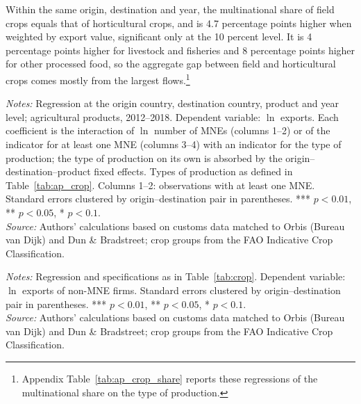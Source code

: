 Within the same origin, destination and year, the multinational share of field crops equals that of
horticultural crops, and is 4.7 percentage points higher when weighted by export value, significant only at the 10
percent level. It is 4 percentage points higher for livestock and fisheries and 8 percentage points higher
for other processed food, so the aggregate gap between field and horticultural crops comes mostly from the largest
flows.\footnote{Appendix Table~\ref{tab:ap_crop_share} reports these regressions of the multinational share on the type of production.}

\begin{table}[htbp]
\centering
\caption{Multinational presence and agricultural exports, by type of production, all firms}
\label{tab:crop}
{\footnotesize\setlength{\tabcolsep}{4pt}\setlength{\extrarowheight}{1pt}
}

\begin{minipage}{0.95\linewidth}
\notesize
\vspace{0.6em}
\textit{Notes:} Regression at the origin country, destination country, product and year level; agricultural products, 2012--2018. Dependent variable: $\ln$ exports. Each coefficient is the interaction of $\ln$ number of MNEs (columns 1--2) or of the indicator for at least one MNE (columns 3--4) with an indicator for the type of production; the type of production on its own is absorbed by the origin--destination--product fixed effects. Types of production as defined in Table~\ref{tab:ap_crop}. Columns 1--2: observations with at least one MNE. Standard errors clustered by origin--destination pair in parentheses. *** $p<0.01$, ** $p<0.05$, * $p<0.1$.\\
\textit{Source:} Authors' calculations based on customs data matched to Orbis (Bureau van Dijk) and Dun \& Bradstreet; crop groups from the FAO Indicative Crop Classification.
\end{minipage}
\end{table}

\begin{table}[htbp]
\centering
\caption{Multinational presence and agricultural exports, by type of production, local firms}
\label{tab:crop_local}
{\footnotesize\setlength{\tabcolsep}{4pt}\setlength{\extrarowheight}{1pt}
}

\begin{minipage}{0.95\linewidth}
\notesize
\vspace{0.6em}
\textit{Notes:} Regression and specifications as in Table~\ref{tab:crop}. Dependent variable: $\ln$ exports of non-MNE firms. Standard errors clustered by origin--destination pair in parentheses. *** $p<0.01$, ** $p<0.05$, * $p<0.1$.\\
\textit{Source:} Authors' calculations based on customs data matched to Orbis (Bureau van Dijk) and Dun \& Bradstreet; crop groups from the FAO Indicative Crop Classification.
\end{minipage}
\end{table}

